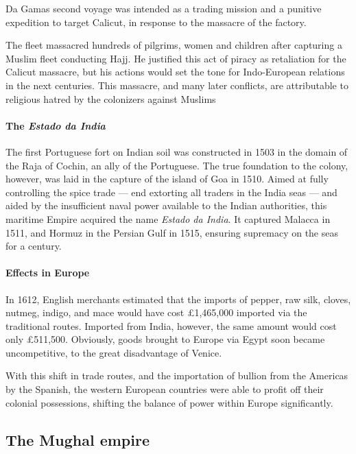\documentclass[11pt, a4paper, headings=standardclasses]{scrartcl}
\begin{document}
Da Gamas second voyage was intended as a trading mission and a punitive expedition to target Calicut, in response to the massacre of the factory.\autocite{Vasco}

The fleet massacred hundreds of pilgrims, women and children after capturing a Muslim fleet conducting Hajj. He justified this act of piracy as retaliation for the Calicut massacre,\autocite{bloomberg} but his actions would set the tone for Indo-European relations in the next centuries. This massacre, and many later conflicts, are attributable to religious hatred by the colonizers against Muslims\autocite[382]{FT}

\paragraph{The \textit{Estado da India}}

The first Portuguese fort on Indian soil was constructed in 1503 in the domain of the Raja of Cochin, an ally of the Portuguese.\autocite[383]{FT} The true foundation to the colony, however, was laid in the capture of the island of Goa in 1510. Aimed at fully controlling the spice trade --- end extorting all traders in the India seas --- and aided by the insufficient naval power available to the Indian authorities\autocite[137]{curtin_1984}, this maritime Empire acquired the name \textit{Estado da India}. It captured Malacca in 1511, and Hormuz in the Persian Gulf in 1515, ensuring supremacy on the seas for a century.\autocite[382--383]{FT}

\paragraph{Effects in Europe}

In 1612, English merchants estimated that the imports of pepper, raw silk, cloves, nutmeg, indigo, and mace would have cost \pounds{}1,465,000 imported via the traditional routes. Imported from India, however, the same amount would cost only \pounds{}511,500.\autocite[393]{RF} Obviously, goods brought to Europe via Egypt soon became uncompetitive, to the great disadvantage of Venice.

With this shift in trade routes, and the importation of bullion from the Americas by the Spanish, the western European countries were able to profit off their colonial possessions, shifting the balance of power within Europe significantly.\autocite{EIC}

\subsection{The Mughal empire}
\end{document}
